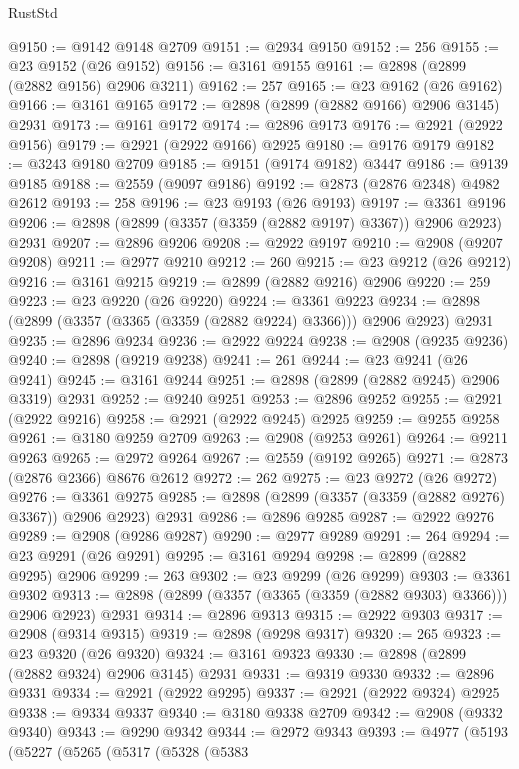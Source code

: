\begin{lexlean}{RustStd}
\begin{coremodule}
@9150 := @9142 @9148 @2709
@9151 := @2934 @9150
@9152 := 256
@9155 := @23 @9152 (@26 @9152)
@9156 := @3161 @9155
@9161 := @2898 (@2899 (@2882 @9156) @2906 @3211)
@9162 := 257
@9165 := @23 @9162 (@26 @9162)
@9166 := @3161 @9165
@9172 := @2898 (@2899 (@2882 @9166) @2906 @3145) @2931
@9173 := @9161 @9172
@9174 := @2896 @9173
@9176 := @2921 (@2922 @9156)
@9179 := @2921 (@2922 @9166) @2925
@9180 := @9176 @9179
@9182 := @3243 @9180 @2709
@9185 := @9151 (@9174 @9182) @3447
@9186 := @9139 @9185
@9188 := @2559 (@9097 @9186)
@9192 := @2873 (@2876 @2348) @4982 @2612
@9193 := 258
@9196 := @23 @9193 (@26 @9193)
@9197 := @3361 @9196
@9206 := @2898 (@2899 (@3357 (@3359 (@2882 @9197) @3367)) @2906 @2923) @2931
@9207 := @2896 @9206
@9208 := @2922 @9197
@9210 := @2908 (@9207 @9208)
@9211 := @2977 @9210
@9212 := 260
@9215 := @23 @9212 (@26 @9212)
@9216 := @3161 @9215
@9219 := @2899 (@2882 @9216) @2906
@9220 := 259
@9223 := @23 @9220 (@26 @9220)
@9224 := @3361 @9223
@9234 := @2898 (@2899 (@3357 (@3365 (@3359 (@2882 @9224) @3366))) @2906 @2923) @2931
@9235 := @2896 @9234
@9236 := @2922 @9224
@9238 := @2908 (@9235 @9236)
@9240 := @2898 (@9219 @9238)
@9241 := 261
@9244 := @23 @9241 (@26 @9241)
@9245 := @3161 @9244
@9251 := @2898 (@2899 (@2882 @9245) @2906 @3319) @2931
@9252 := @9240 @9251
@9253 := @2896 @9252
@9255 := @2921 (@2922 @9216)
@9258 := @2921 (@2922 @9245) @2925
@9259 := @9255 @9258
@9261 := @3180 @9259 @2709
@9263 := @2908 (@9253 @9261)
@9264 := @9211 @9263
@9265 := @2972 @9264
@9267 := @2559 (@9192 @9265)
@9271 := @2873 (@2876 @2366) @8676 @2612
@9272 := 262
@9275 := @23 @9272 (@26 @9272)
@9276 := @3361 @9275
@9285 := @2898 (@2899 (@3357 (@3359 (@2882 @9276) @3367)) @2906 @2923) @2931
@9286 := @2896 @9285
@9287 := @2922 @9276
@9289 := @2908 (@9286 @9287)
@9290 := @2977 @9289
@9291 := 264
@9294 := @23 @9291 (@26 @9291)
@9295 := @3161 @9294
@9298 := @2899 (@2882 @9295) @2906
@9299 := 263
@9302 := @23 @9299 (@26 @9299)
@9303 := @3361 @9302
@9313 := @2898 (@2899 (@3357 (@3365 (@3359 (@2882 @9303) @3366))) @2906 @2923) @2931
@9314 := @2896 @9313
@9315 := @2922 @9303
@9317 := @2908 (@9314 @9315)
@9319 := @2898 (@9298 @9317)
@9320 := 265
@9323 := @23 @9320 (@26 @9320)
@9324 := @3161 @9323
@9330 := @2898 (@2899 (@2882 @9324) @2906 @3145) @2931
@9331 := @9319 @9330
@9332 := @2896 @9331
@9334 := @2921 (@2922 @9295)
@9337 := @2921 (@2922 @9324) @2925
@9338 := @9334 @9337
@9340 := @3180 @9338 @2709
@9342 := @2908 (@9332 @9340)
@9343 := @9290 @9342
@9344 := @2972 @9343
@9393 := @4977
    (@5193
      (@5227
        (@5265
          (@5317
            (@5328
              (@5383

\end{coremodule}
\end{lexlean}
